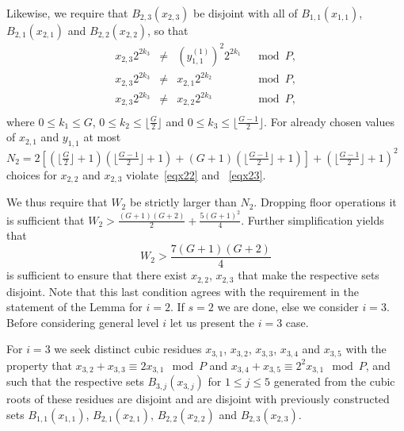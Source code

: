 Likewise, we require that $B_{2,3}(x_{2,3})$ be disjoint with all
of  $B_{1,1}(x_{1,1})$, $B_{2,1}(x_{2,1})$ and $B_{2,2}(x_{2,2})$,
so that
\begin{equation}\label{eqx23}\begin{array}{cccc}
x_{2,3}2^{2k_3} &\neq& (y_{1,1}^{(1)})^2 2^{2k_1} &\mod P, \\
x_{2,3}2^{2k_3} &\neq& x_{2,1} 2^{2k_2} &\mod P, \\
x_{2,3}2^{2k_3} &\neq& x_{2,2} 2^{2k_3} &\mod P, \\
\end{array}\end{equation}
where $0 \leq k_1 \leq G$, $0 \leq k_2 \leq \lfloor \frac{G}{2}
\rfloor$ and $0 \leq k_3 \leq \lfloor\frac{G-1}{2} \rfloor$. For
already chosen values of $x_{2,1}$ and $y_{1,1}$ at most $N_2=
2\left[ \left(\lfloor \frac{G}{2} \rfloor +1 \right)\left(\lfloor
\frac{G-1}{2} \rfloor +1 \right)+ \left( G+1 \right)\left(\lfloor
\frac{G-1}{2} \rfloor +1 \right)\right]+\left( \lfloor
\frac{G-1}{2} \rfloor +1 \right)^2  $ choices for $x_{2,2}$ and
$x_{2,3}$ violate~\eqref{eqx22} and ~\eqref{eqx23}.

We thus require that $W_2$ be strictly larger than $N_2$. Dropping
floor operations it is sufficient that $W_2 > \frac{(G+1)(G+2)}{2}
+ \frac{5(G+1)^2}{4}$. Further  simplification yields that
\begin{equation}
W_2 > \frac{7(G+1)(G+2)}{4}
\end{equation}
is sufficient to ensure that there exist $x_{2,2}$, $x_{2,3}$ that
make the respective sets disjoint. Note that this last condition
agrees with the requirement in the statement of the Lemma for
$i=2$. If $s=2$ we are done, else we consider $i=3$. Before
considering general level $i$ let us present the $i=3$ case.

For $i=3$ we seek distinct cubic residues $x_{3,1}$, $x_{3,2}$,
$x_{3,3}$, $x_{3,4}$ and $x_{3,5}$ with the property that
$x_{3,2}+ x_{3,3} \equiv 2x_{3,1} \mod P$ and $x_{3,4}+ x_{3,5}
\equiv 2^2x_{3,1} \mod P$, and such that the respective sets
$B_{3,j}(x_{3,j})$ for $1 \leq j \leq 5$ generated from the cubic
roots of these residues are disjoint and are disjoint with
previously constructed sets $B_{1,1}(x_{1,1})$,
$B_{2,1}(x_{2,1})$, $B_{2,2}(x_{2,2})$ and $B_{2,3}(x_{2,3})$.


